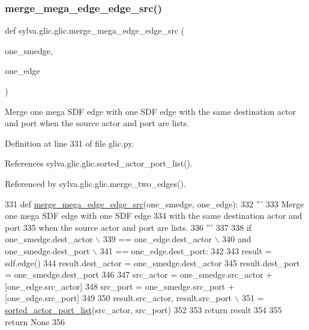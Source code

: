 \subsubsection{\texorpdfstring{merge\+\_\+mega\+\_\+edge\+\_\+edge\+\_\+src()}{merge\_mega\_edge\_edge\_src()}}
{\footnotesize\ttfamily def sylva.\+glic.\+glic.\+merge\+\_\+mega\+\_\+edge\+\_\+edge\+\_\+src (\begin{DoxyParamCaption}\item[{}]{one\+\_\+smedge,  }\item[{}]{one\+\_\+edge }\end{DoxyParamCaption})}

\begin{DoxyVerb}  Merge one mega SDF edge with one SDF edge
  with the same destination actor and port
  when the source actor and port are lists.
\end{DoxyVerb}
 

Definition at line 331 of file glic.\+py.



References sylva.\+glic.\+glic.\+sorted\+\_\+actor\+\_\+port\+\_\+list().



Referenced by sylva.\+glic.\+glic.\+merge\+\_\+two\+\_\+edges().


\begin{DoxyCode}
331   \textcolor{keyword}{def }\hyperlink{namespacesylva_1_1glic_1_1glic_adaac876d9630352fd0f5e4e3350d5b30}{merge\_mega\_edge\_edge\_src}(one\_smedge, one\_edge):
332     \textcolor{stringliteral}{'''}
333 \textcolor{stringliteral}{      Merge one mega SDF edge with one SDF edge}
334 \textcolor{stringliteral}{      with the same destination actor and port}
335 \textcolor{stringliteral}{      when the source actor and port are lists.}
336 \textcolor{stringliteral}{    '''}
337 
338     \textcolor{keywordflow}{if} one\_smedge.dest\_actor \(\backslash\)
339             == one\_edge.dest\_actor \(\backslash\)
340             \textcolor{keywordflow}{and} one\_smedge.dest\_port \(\backslash\)
341             == one\_edge.dest\_port:
342 
343       result = sdf.edge()
344       result.dest\_actor = one\_smedge.dest\_actor
345       result.dest\_port = one\_smedge.dest\_port
346 
347       src\_actor = one\_smedge.src\_actor + [one\_edge.src\_actor]
348       src\_port = one\_smedge.src\_port + [one\_edge.src\_port]
349 
350       result.src\_actor, result.src\_port \(\backslash\)
351           = \hyperlink{namespacesylva_1_1glic_1_1glic_af9c053311339f7220d8a605b492126c0}{sorted\_actor\_port\_list}(src\_actor, src\_port)
352 
353       \textcolor{keywordflow}{return} result
354 
355     \textcolor{keywordflow}{return} \textcolor{keywordtype}{None}
356 
\end{DoxyCode}
\mbox{\label{namespacesylva_1_1glic_1_1glic_aa4a9eb6227bd109eec96e5c1ad6579c5}} 
